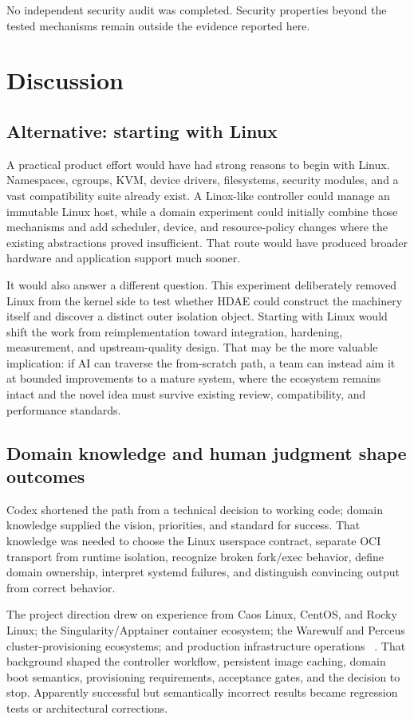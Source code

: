 \documentclass[11pt]{article}
\begin{document}
No independent security audit was completed. Security properties beyond the
tested mechanisms remain outside the evidence reported here.

\section{Discussion}

\subsection{Alternative: starting with Linux}

A practical product effort would have had strong reasons to begin with Linux.
Namespaces, cgroups, KVM, device drivers, filesystems, security modules, and a
vast compatibility suite already exist. A Linox-like controller could manage
an immutable Linux host, while a domain experiment could initially combine
those mechanisms and add scheduler, device, and resource-policy changes where
the existing abstractions proved insufficient. That route would have produced
broader hardware and application support much sooner.

It would also answer a different question. This experiment deliberately
removed Linux from the kernel side to test whether HDAE could
construct the machinery itself and discover a distinct outer isolation object.
Starting with Linux would shift the work from reimplementation toward
integration, hardening, measurement, and upstream-quality design. That may be
the more valuable implication: if AI can traverse the from-scratch path, a
team can instead aim it at bounded improvements to a mature system, where
the ecosystem remains intact and the novel idea must survive existing review,
compatibility, and performance standards.

\subsection{Domain knowledge and human judgment shape outcomes}

Codex shortened the path from a technical decision to working code; domain
knowledge supplied the vision, priorities, and standard for success. That
knowledge was needed to choose the Linux userspace contract, separate OCI
transport from runtime isolation, recognize broken fork/exec behavior, define
domain ownership, interpret systemd failures, and distinguish convincing output
from correct behavior.

The project direction drew on experience from Caos Linux, CentOS, and Rocky
Linux; the Singularity/Apptainer container ecosystem; the Warewulf and Perceus
cluster-provisioning ecosystems; and production infrastructure operations
~\cite{rockyAbout2026,ciqKurtzer2026}. That background shaped the controller
workflow, persistent image caching, domain boot semantics, provisioning
requirements, acceptance gates, and the decision to stop. Apparently
successful but semantically incorrect results became regression tests or
architectural corrections.
\end{document}
